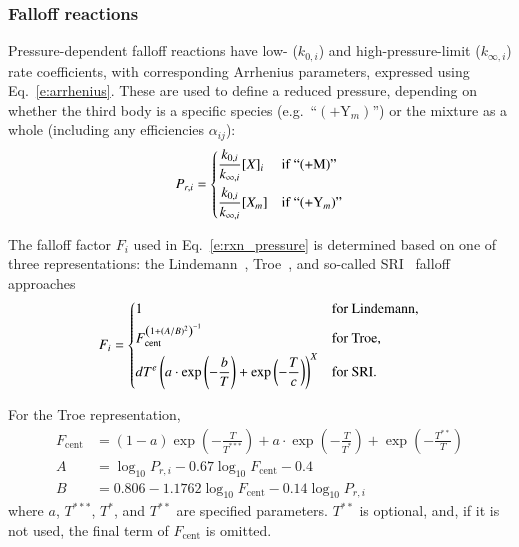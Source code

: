 \documentclass[preprint,12pt]{elsarticle}
\begin{document}
\subsubsection{Falloff reactions}

Pressure-dependent falloff reactions have low- ($k_{0, i}$) and high-pressure-limit ($k_{\infty,i}$) rate coefficients, with corresponding Arrhenius parameters, expressed using Eq.~\eqref{e:arrhenius}.
These are used to define a reduced pressure, depending on whether the third body is a specific species (e.g.\ ``$(+\text{Y}_m)$'') or the mixture as a whole (including any efficiencies $\alpha_{i j}$):
\begin{equation}
P_{r,i} = \begin{dcases}
\frac{k_{0,i}}{k_{\infty,i}} [X]_i &\text{if ``(+M)''} \\
\frac{k_{0,i}}{k_{\infty,i}} [X_m] &\text{if ``} (+\text{Y}_m\text{)''}
\end{dcases}
\label{e:pr_i}
\end{equation}

The falloff factor $F_i$ used in Eq.~\eqref{e:rxn_pressure} is determined based on one of three representations: the Lindemann~\cite{Lindemann:1922cz}, Troe~\cite{Gilbert:1983bb}, and so-called SRI~\cite{Stewart:1989gj} falloff approaches
\begin{equation}
F_i = \begin{dcases}
1 &\text{for Lindemann,} \\
F_{\text{cent}}^{ \left( 1 + ( A / B )^2 \right)^{-1} } &\text{for Troe, } \\
d T^e \left( a \cdot \exp \left( -\frac{b}{T} \right) + \exp \left( -\frac{T}{c} \right) \right)^X &\text{for SRI.}
\end{dcases}
\end{equation}

For the Troe representation,
\begin{align}
F_{\text{cent}} &= (1 - a) \exp \left( -\frac{T}{T^{***}} \right) + a\cdot \exp \left( -\frac{T}{T^*} \right) + \exp \left( -\frac{T^{**}}{T} \right) \\
A &= \log_{10} P_{r,i} - 0.67 \log_{10} F_{\text{cent}} - 0.4 \\
B &= 0.806 - 1.1762 \log_{10} F_{\text{cent}} - 0.14 \log_{10} P_{r,i}
\end{align}
where $a$, $T^{***}$, $T^*$, and $T^{**}$ are specified parameters. $T^{**}$ is optional, and, if it is not used, the final term of $F_{\text{cent}}$ is omitted.
\end{document}
